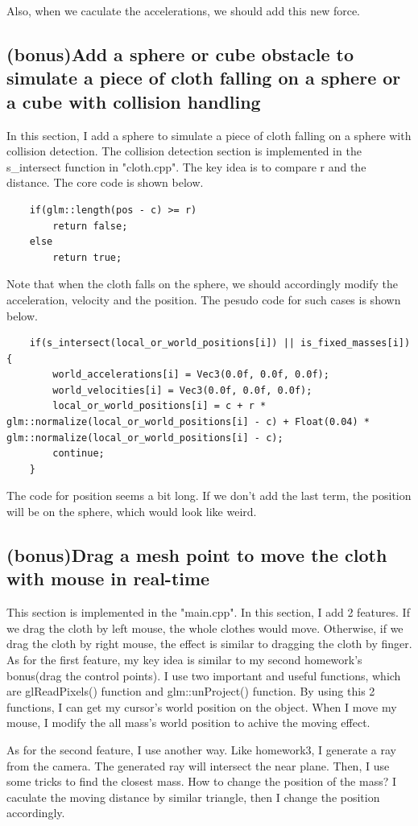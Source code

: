 \documentclass[acmtog]{acmart}
\begin{document}
Also, when we caculate the accelerations, we should add this new force.
\subsection{(bonus)Add a sphere or cube obstacle to simulate a piece of cloth falling on a sphere or a cube with collision handling}
\quad In this section, I add a sphere to simulate a piece of cloth falling on a sphere with collision detection. The collision detection section is implemented in the s\_intersect function in "cloth.cpp". The key 
idea is to compare r and the distance. The core code is shown below.
\begin{lstlisting}
	if(glm::length(pos - c) >= r)
		return false;
	else
		return true;
\end{lstlisting}

Note that when the cloth falls on the sphere, we should accordingly modify the acceleration, velocity and the position. 
The pesudo code for such cases is shown below.
\begin{lstlisting}
	if(s_intersect(local_or_world_positions[i]) || is_fixed_masses[i]) {
		world_accelerations[i] = Vec3(0.0f, 0.0f, 0.0f);
		world_velocities[i] = Vec3(0.0f, 0.0f, 0.0f);
		local_or_world_positions[i] = c + r * glm::normalize(local_or_world_positions[i] - c) + Float(0.04) * glm::normalize(local_or_world_positions[i] - c);
		continue;
	}
\end{lstlisting}
\quad The code for position seems a bit long. If we don't add the last term, the position will be on the sphere, which would look like weird.
\subsection{(bonus)Drag a mesh point to move the cloth with mouse in real-time}
\quad This section is implemented in the "main.cpp". In this section, I add 2 features. If we drag the cloth by left mouse, the whole clothes would move. Otherwise, if we drag the cloth by right mouse, the effect is similar to dragging the cloth by finger.
As for the first feature, my key idea is similar to my second homework's bonus(drag the control points). I use two important and useful functions, which are glReadPixels() function and glm::unProject() function. By using this 2 functions, I can get my cursor's world position on the object. When I move my mouse, I modify the 
all mass's world position to achive the moving effect.

As for the second feature, I use another way. Like homework3, I generate a ray from the camera. The generated ray will intersect the near plane. Then, I use some tricks to find the closest mass. How to change the position of the mass? I caculate the moving distance by similar triangle, then I change the position accordingly.
\end{document}

